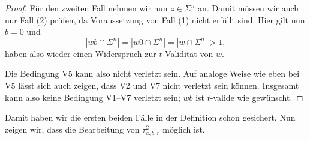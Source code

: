 \begin{proof}
    Für den zweiten Fall nehmen wir nun $z\in\Sigma^n$ an.
    Damit müssen wir auch nur Fall (2) prüfen, da Voraussetzung von Fall (1) nicht erfüllt sind.
    Hier gilt nun $b=0$ und
    \[ |wb\cap\Sigma^n|=|w0\cap\Sigma^n|=|w\cap\Sigma^n|>1, \]
    haben also wieder einen Widerspruch zur $t$-Validität von $w$.

    Die Bedingung V5 kann also nicht verletzt sein.
    Auf analoge Weise wie eben bei V5 lässt sich auch zeigen, dass V2 und V7 nicht verletzt sein können.
    Insgesamt kann also keine Bedingung V1--V7 verletzt sein; $wb$ ist $t$-valide wie gewünscht.
\end{proof}

Damit haben wir die ersten beiden Fälle in der Definition schon gesichert. Nun zeigen wir, dass die Bearbeitung von $\tau^2_{a,b,r}$ möglich ist.

